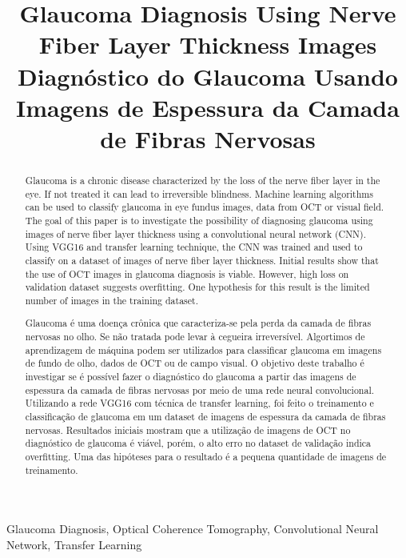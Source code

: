 \documentclass[conference]{IEEEtran}
\begin{document}
\title{Glaucoma Diagnosis Using Nerve Fiber Layer Thickness Images \\ Diagnóstico do Glaucoma Usando Imagens de Espessura da Camada de Fibras Nervosas}


\author{
}


\maketitle

\thispagestyle{fancy}


\renewcommand{\abstractname}{Abstract}
\begin{abstract}
Glaucoma is a chronic disease characterized by the loss of the nerve fiber layer in the eye. If not treated it can lead to irreversible blindness. Machine learning algorithms can be used to classify glaucoma in eye fundus images, data from OCT or visual field. The goal of this paper is to investigate the possibility of diagnosing glaucoma using images of nerve fiber layer thickness using a convolutional neural network (CNN). Using VGG16 and transfer learning  technique, the CNN was trained and used to classify on a dataset of images of nerve fiber layer thickness. Initial results show that the use of OCT images in glaucoma diagnosis is viable. However, high loss on validation dataset suggests overfitting. One hypothesis for this result is the limited number of images in the training dataset.
\end{abstract}

\renewcommand\IEEEkeywordsname{Keywords}
\begin{IEEEkeywords}
\label{Keywords}
Glaucoma Diagnosis, Optical Coherence Tomography, Convolutional Neural Network, Transfer Learning
\end{IEEEkeywords}

\renewcommand{\abstractname}{Resumo}
\begin{abstract}
\label{Resumo}
Glaucoma é uma doença crônica que caracteriza-se pela perda da camada de fibras nervosas no olho. Se não tratada pode levar à cegueira irreversível. Algortimos de aprendizagem de máquina podem ser utilizados para classificar glaucoma em imagens de fundo de olho, dados de OCT ou de campo visual. O objetivo deste trabalho é investigar se é possível fazer o diagnóstico do glaucoma a partir das imagens de espessura da camada de fibras nervosas por meio de uma rede neural convolucional. Utilizando a rede VGG16 com técnica de transfer learning, foi feito o treinamento e classificação de glaucoma em um dataset de imagens de espessura da camada de fibras nervosas. Resultados iniciais mostram que a utilização de imagens de OCT no diagnóstico de glaucoma é viável, porém, o alto erro no dataset de validação indica overfitting. Uma das hipóteses para o resultado é a pequena quantidade de imagens de treinamento.

\end{abstract}
\end{document}
